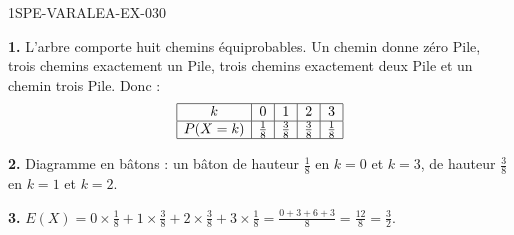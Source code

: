 \begin{corrige}{1SPE-VARALEA-EX-030}

\textbf{1.} L'arbre comporte huit chemins équiprobables. Un chemin donne zéro Pile, trois chemins exactement un Pile, trois chemins exactement deux Pile et un chemin trois Pile. Donc :
\[
\begin{array}{|c|c|c|c|c|}
\hline
k & 0 & 1 & 2 & 3 \\
\hline
P(X=k) & \frac{1}{8} & \frac{3}{8} & \frac{3}{8} & \frac{1}{8} \\
\hline
\end{array}
\]

\medskip
\textbf{2.} Diagramme en bâtons : un bâton de hauteur $\frac{1}{8}$ en $k=0$ et $k=3$, de hauteur $\frac{3}{8}$ en $k=1$ et $k=2$.

\medskip
\textbf{3.} $E(X) = 0 \times \frac{1}{8} + 1 \times \frac{3}{8} + 2 \times \frac{3}{8} + 3 \times \frac{1}{8} = \frac{0+3+6+3}{8} = \frac{12}{8} = \frac{3}{2}$.

\end{corrige}
